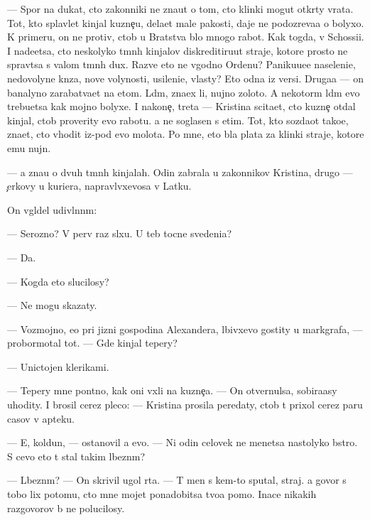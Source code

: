 \documentclass[10pt]{book}
\begin{document}
— Spor{\io} na dukat, cto zakonniki ne zna{\y}ut o tom, cto klinki mogut otkr{\yi}ty vra\-ta. Tot, kto splavl{\ia}{\y}et kinjal{\yi} kuzne{\c}u, dela{\y}et mal{\yi}{\y}e pakosti, daje ne podozreva{\y}a o bolyxo{\y}. K primeru, on ne protiv, ctob{\yi} u Bratstva b{\yi}lo mnogo rabot{\yi}. Kak togda, v Schossi{\y}i. I nade{\y}etsa, cto neskolyko t{\e}mn{\yi}h kinjalov diskreditiru{\y}ut straje{\y}, ko\-to\-r{\yi}\-{\y}e prosto ne sprav{\ia}tsa s valom t{\e}mn{\yi}h dux. Razve eto ne v{\yi}godno Ordenu? Paniku{\y}u{\x}e{\y}e naseleni{\y}e, nedovolyn{\yi}{\y}e kn{\ia}z{\y}a, nov{\yi}{\y}e volynosti, usileni{\y}e, vlas\-ty? Eto odna iz versi{\y}. Druga{\y}a — on banalyno zarabat{\yi}va{\y}et na etom. L{\io}d{\ia}m, zna\-{\y}ex li, nujno zoloto. A nekotor{\yi}m l{\io}d{\ia}m {\y}evo trebu{\y}etsa kak mojno bolyxe. I na\-ko\-ne{\c}, tret{\y}a — Kristina sci\-ta\-{\y}et, cto kuzne{\c} otdal kinjal, ctob{\yi} proverity {\y}evo rabotu. {\Y}a ne soglasen s etim. Tot, kto sozda{\y}ot tako{\y}e, zna{\y}et, cto v{\yi}hodit iz-pod {\y}evo molota. Po mne, eto b{\yi}la plata za klinki straje{\y}, ko\-to\-r{\yi}\-{\y}e {\y}emu nujn{\yi}.

— {\Y}a zna{\y}u o dvuh t{\e}mn{\yi}h kinjalah. Odin zabrala u zakonnikov Kristina, drugo{\y} — {\c}erkovy u kuriera, napravl{\ia}vxevosa v Latku.

On v{\yi}gl{\ia}del udivl{\e}nn{\yi}m:

— Ser{\y}ozno? V perv{\yi}{\y} raz sl{\yi}xu. U teb{\ia} tocn{\yi}{\y}e svedeni{\y}a?

— Da.

— Kogda eto slucilosy?

— Ne mogu skazaty.

— Voz\-moj\-no, {\y}e{\x}o pri jizni gospodina Alexandera, l{\io}bivxevo gostity u markgrafa, — probormotal tot. — Gde kinjal tepery?

— Unictojen klerikami.

— Tepery mne pon{\ia}tno, kak oni v{\yi}xli na kuzne{\c}a. — On otvernulsa, sobira{\y}asy uhodity. I brosil cerez pleco: — Kristina prosila peredaty, ctob{\yi} t{\yi} prixol cerez paru casov v apteku.

— E{\y}, koldun, — ostanovil {\y}a {\y}evo. — Ni odin celovek ne men{\ia}{\y}etsa nastolyko b{\yi}stro. S cevo eto t{\yi} stal takim l{\io}bezn{\yi}m?

— L{\io}bezn{\yi}m? — On skrivil ugol rta. — T{\yi} men{\ia} s kem-to sputal, straj. {\Y}a govor{\io} s tobo{\y} lix potomu, cto mne mojet ponadobitsa tvo{\y}a pomo{\x}. Inace nikakih razgovorov b{\yi} ne polucilosy.
\end{document}
